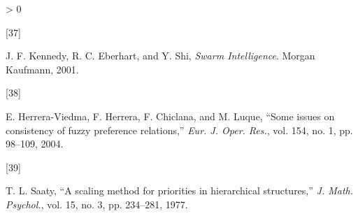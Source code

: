 \documentclass[
]{article}
\newlength{\cslhangindent}
\newlength{\csllabelwidth}
\newenvironment{CSLReferences}[2] %
 {%
  \setlength{\parindent}{0pt}
  \ifodd #1 \everypar{\setlength{\hangindent}{\cslhangindent}}\ignorespaces\fi
  \ifnum #2 > 0
  \setlength{\parskip}{#2\baselineskip}
  \fi
 }%
 {}
\newcommand{\CSLLeftMargin}[1]{\parbox[t]{\csllabelwidth}{#1}}
\newcommand{\CSLRightInline}[1]{\parbox[t]{\linewidth - \csllabelwidth}{#1}\break}
\begin{document}
\begin{CSLReferences}{0}{0}
\leavevmode\hypertarget{ref-kennedy2001swarm}{}%
\CSLLeftMargin{{[}37{]} }
\CSLRightInline{J. F. Kennedy, R. C. Eberhart, and Y. Shi, \emph{Swarm
{Intelligence}}. {Morgan Kaufmann}, 2001.}

\leavevmode\hypertarget{ref-herrera2004some}{}%
\CSLLeftMargin{{[}38{]} }
\CSLRightInline{E. Herrera-Viedma, F. Herrera, F. Chiclana, and M.
Luque, {``Some issues on consistency of fuzzy preference relations,''}
\emph{Eur. J. Oper. Res.}, vol. 154, no. 1, pp. 98--109, 2004.}

\leavevmode\hypertarget{ref-saaty1977scaling}{}%
\CSLLeftMargin{{[}39{]} }
\CSLRightInline{T. L. Saaty, {``A scaling method for priorities in
hierarchical structures,''} \emph{J. Math. Psychol.}, vol. 15, no. 3,
pp. 234--281, 1977.}

\end{CSLReferences}
\end{document}
